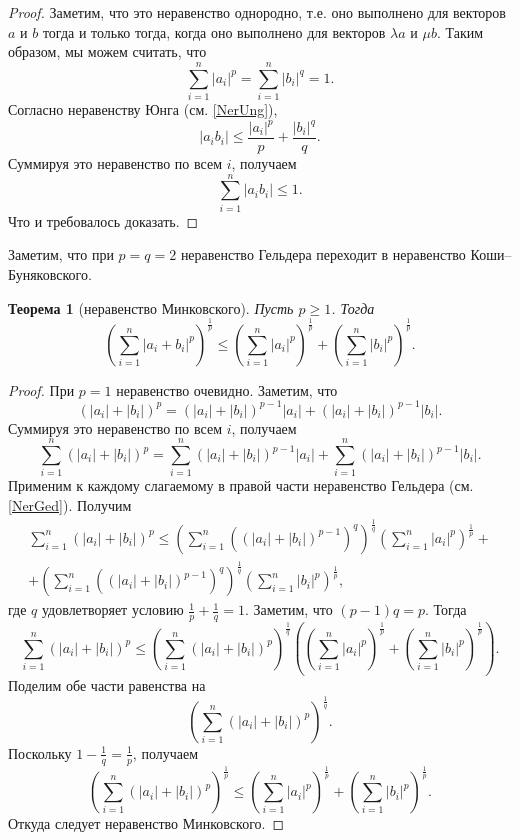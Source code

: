 \documentclass[12pt, titlepage, oneside]{amsbook}
\newtheorem{theorem}{Теорема}[chapter]
\theoremstyle{definition}
\theoremstyle{remark}
\begin{document}
\begin{proof}
Заметим, что это неравенство однородно, т.е. оно выполнено для векторов $a$ и $b$ тогда и только тогда, когда оно выполнено для векторов $\lambda a$ и $\mu b$. Таким образом, мы можем считать, что $$\sum\limits_{i=1}^n |a_i|^p=\sum\limits_{i=1}^n |b_i|^q=1.$$ Согласно неравенству Юнга (см. \ref{NerUng}), $$|a_i b_i|\leq\frac{|a_i|^p}{p}+\frac{|b_i|^q}{q}.$$ Суммируя это неравенство по всем $i$, получаем $$\sum\limits_{i=1}^n |a_i b_i|\leq 1.$$ Что и требовалось доказать.
\end{proof}

Заметим, что при $p=q=2$ неравенство Гельдера переходит в неравенство Коши--Буняковского.

\begin{theorem}[неравенство Минковского]
\label{NerMin}
Пусть $p\geq 1$. Тогда $$\left(\sum\limits_{i=1}^n |a_i+b_i|^p\right)^{\frac{1}{p}}\leq\left(\sum\limits_{i=1}^n |a_i|^p\right)^{\frac{1}{p}}+\left(\sum\limits_{i=1}^n |b_i|^p\right)^{\frac{1}{p}}.$$
\end{theorem}

\begin{proof}
При $p=1$ неравенство очевидно. Заметим, что $$(|a_i|+|b_i|)^p=(|a_i|+|b_i|)^{p-1}|a_i|+(|a_i|+|b_i|)^{p-1}|b_i|.$$ Суммируя это неравенство по всем $i$, получаем $$\sum\limits_{i=1}^n(|a_i|+|b_i|)^p=\sum\limits_{i=1}^n(|a_i|+|b_i|)^{p-1}|a_i|+\sum\limits_{i=1}^n(|a_i|+|b_i|)^{p-1}|b_i|.$$ Применим к каждому слагаемому в правой части неравенство Гельдера (см. \ref{NerGed}). Получим
\begin{gather*}\sum\limits_{i=1}^n(|a_i|+|b_i|)^p\leq\left(\sum\limits_{i=1}^n((|a_i|+|b_i|)^{p-1})^q\right)^{\frac{1}{q}}\left(\sum\limits_{i=1}^n |a_i|^p\right)^{\frac{1}{p}}+\\
+\left(\sum\limits_{i=1}^n((|a_i|+|b_i|)^{p-1})^q\right)^{\frac{1}{q}}\left(\sum\limits_{i=1}^n |b_i|^p\right)^{\frac{1}{p}},\end{gather*} где $q$ удовлетворяет условию $\frac{1}{p}+\frac{1}{q}=1$. Заметим, что $(p-1)q=p$. Тогда $$\sum\limits_{i=1}^n(|a_i|+|b_i|)^p\leq \left(\sum\limits_{i=1}^n(|a_i|+|b_i|)^{p}\right)^{\frac{1}{q}}\left(\left(\sum\limits_{i=1}^n |a_i|^p\right)^{\frac{1}{p}}+\left(\sum\limits_{i=1}^n |b_i|^p\right)^{\frac{1}{p}}\right).$$ Поделим обе части равенства на $$\left(\sum\limits_{i=1}^n(|a_i|+|b_i|)^{p}\right)^{\frac{1}{q}}.$$ Поскольку $1-\frac{1}{q}=\frac{1}{p}$, получаем $$\left(\sum\limits_{i=1}^n(|a_i|+|b_i|)^p\right)^{\frac{1}{p}}\leq \left(\sum\limits_{i=1}^n |a_i|^p\right)^{\frac{1}{p}}+\left(\sum\limits_{i=1}^n |b_i|^p\right)^{\frac{1}{p}}.$$ Откуда следует неравенство Минковского.
\end{proof}
\end{document}
